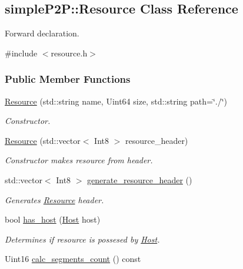 \hypertarget{classsimpleP2P_1_1Resource}{}\subsection{simple\+P2P\+:\+:Resource Class Reference}
\label{classsimpleP2P_1_1Resource}


Forward declaration.  




{\ttfamily \#include $<$resource.\+h$>$}

\subsubsection*{Public Member Functions}
\begin{DoxyCompactItemize}
\item 
\hyperlink{classsimpleP2P_1_1Resource_a0aed54e6cf7d3a5fa2c53fe3b3b57d19}{Resource} (std\+::string name, Uint64 size, std\+::string path=\char`\"{}./\char`\"{})
\begin{DoxyCompactList}\small\item\em Constructor. \end{DoxyCompactList}\item 
\hyperlink{classsimpleP2P_1_1Resource_a06890bc51f5d591aa562fb009f915ea4}{Resource} (std\+::vector$<$ Int8 $>$ resource\+\_\+header)
\begin{DoxyCompactList}\small\item\em Constructor makes resource from header. \end{DoxyCompactList}\item 
std\+::vector$<$ Int8 $>$ \hyperlink{classsimpleP2P_1_1Resource_ad2f3883ae1993c7788aecf34b8fb8470}{generate\+\_\+resource\+\_\+header} ()
\begin{DoxyCompactList}\small\item\em Generates \hyperlink{classsimpleP2P_1_1Resource}{Resource} header. \end{DoxyCompactList}\item 
bool \hyperlink{classsimpleP2P_1_1Resource_ac3c067c66ef0db0a25a7904a83f50e3d}{has\+\_\+host} (\hyperlink{classsimpleP2P_1_1Host}{Host} host)
\begin{DoxyCompactList}\small\item\em Determines if resource is possesed by \hyperlink{classsimpleP2P_1_1Host}{Host}. \end{DoxyCompactList}\item 
Uint16 \hyperlink{classsimpleP2P_1_1Resource_a4bbfde4d1e25c62ae4da0e6dfd64900b}{calc\+\_\+segments\+\_\+count} () const

\end{DoxyCompactItemize}
